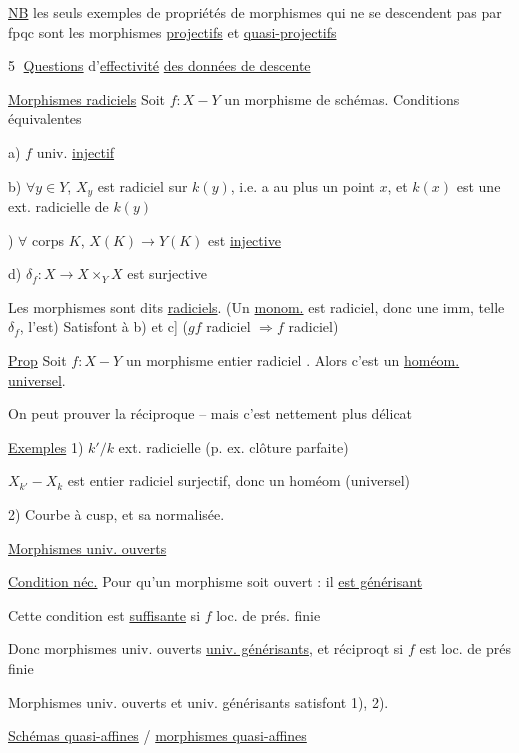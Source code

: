 \uline{NB} les seuls exemples de propriétés de morphismes qui ne se descendent pas par fpqc sont les morphismes \uline{projectifs} et \uline{quasi-projectifs}

\textcircled{5} \uline{Questions} d'\uline{effectivité} \uline{des données de descente}

\uline{Morphismes radiciels} \quad Soit $f:X\mathrel{-}Y$ un morphisme de schémas. Conditions équivalentes

a) $f$ univ. \uline{injectif}

b) $\forall y\in Y$, $X_y$ est radiciel sur $k(y)$, i.e.  a au plus un point $x$, et $k(x)$ est une ext. radicielle de $k(y)$

) $\forall$ corps $K$, $X(K)\longrightarrow Y(K)$ est \uline{injective}

d) $\delta_f:X\longrightarrow X\times_Y X$ est surjective

Les morphismes sont dits \uline{radiciels}. (Un \uline{monom.} est radiciel, donc une imm, telle $\delta_f$, l'est) Satisfont à b) et c] ($gf$ radiciel $\Rightarrow f$ radiciel)

\uline{Prop} Soit $f:X\mathrel{-}Y$ un morphisme entier radiciel . Alors c'est un \uline{homéom.}  \uline{universel}.

On peut prouver la réciproque -- mais c'est nettement plus délicat

\uline{Exemples} 1) $k'/k$ ext. radicielle (p. ex. clôture parfaite)

$X_{k'}\mathrel{-}X_k$ est entier radiciel surjectif, donc un homéom (universel)

2) Courbe à cusp, et sa normalisée.

\uline{Morphismes univ. ouverts}

\uline{Condition néc.} Pour qu'un morphisme soit ouvert : il \uline{est générisant}

Cette condition est \uline{suffisante} si $f$ loc. de prés. finie

Donc morphismes univ. ouverts  \uline{univ. générisants}, et réciproqt si $f$ est loc. de prés finie

Morphismes univ. ouverts et univ. générisants satisfont 1), 2).

\uline{Schémas quasi-affines}  / \uline{morphismes quasi-affines}

